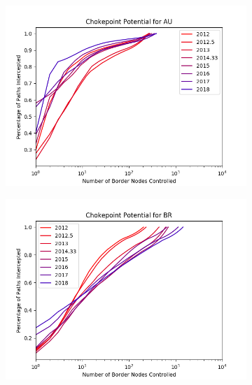 \documentclass{article}
\begin{document}
\begin{multicols}{2}
\begin{figure}
	\centering
	\begin{subfigure}[b]{0.4\linewidth}
		\includegraphics[width=\linewidth]{single_AU}
	\end{subfigure}
	\begin{subfigure}[b]{0.4\linewidth}
		\includegraphics[width=\linewidth]{single_BR}
	\end{subfigure}
	\\
	\begin{subfigure}[b]{0.4\linewidth}

\end{subfigure}
\end{figure}
\end{multicols}
\end{document}
